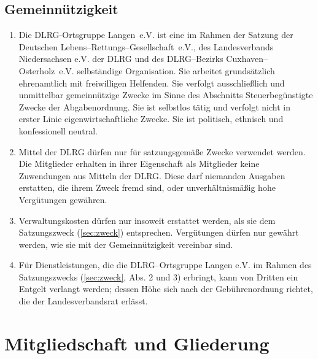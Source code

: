 \documentclass[%
12pt, %
a4paper, %
headsepline, %
parskip, %
headings=normal, %
]{scrreprt}
\begin{document}
\section{Gemeinnützigkeit}
\label{sec:gemeinnuetzigkeit}
\begin{enumerate}
    \item Die DLRG-Ortsgruppe Langen~e.V. ist eine im Rahmen der Satzung der Deutschen Lebens--Rettungs--Gesellschaft~e.V., des Landesverbands Niedersachsen e.V. der DLRG und des DLRG--Bezirks Cuxhaven--Osterholz~e.V. selbständige Organisation. Sie arbeitet grundsätzlich ehrenamtlich mit freiwilligen Helfenden. Sie verfolgt ausschließlich und unmittelbar gemeinnützige Zwecke im Sinne des Abschnitts \glqq{}Steuerbegünstigte Zwecke\grqq{} der Abgabenordnung. Sie ist selbstlos tätig und verfolgt nicht in erster Linie eigenwirtschaftliche Zwecke. Sie ist politisch, ethnisch und konfessionell neutral.
    \item Mittel der DLRG dürfen nur für satzungsgemäße Zwecke verwendet werden. Die Mitglieder erhalten in ihrer Eigenschaft als Mitglieder keine Zuwendungen aus Mitteln der DLRG. Diese darf niemanden Ausgaben erstatten, die ihrem Zweck fremd sind, oder unverhältnismäßig hohe Vergütungen gewähren.
    \item Verwaltungskosten dürfen nur insoweit erstattet werden, als sie dem Satzungszweck (\ref{sec:zweck}) entsprechen. Vergütungen dürfen nur gewährt werden, wie sie mit der Gemeinnützigkeit vereinbar sind.
    \item Für Dienstleistungen, die die DLRG--Ortsgruppe Langen e.V. im Rahmen des Satzungszwecks (\ref{sec:zweck}, Abs. 2 und 3) erbringt, kann von Dritten ein Entgelt verlangt werden; dessen Höhe sich nach der Gebührenordnung richtet, die der Landesverbandsrat erlässt.
\end{enumerate}

\chapter{Mitgliedschaft und Gliederung}
\setcounter{section}{3}
\end{document}
